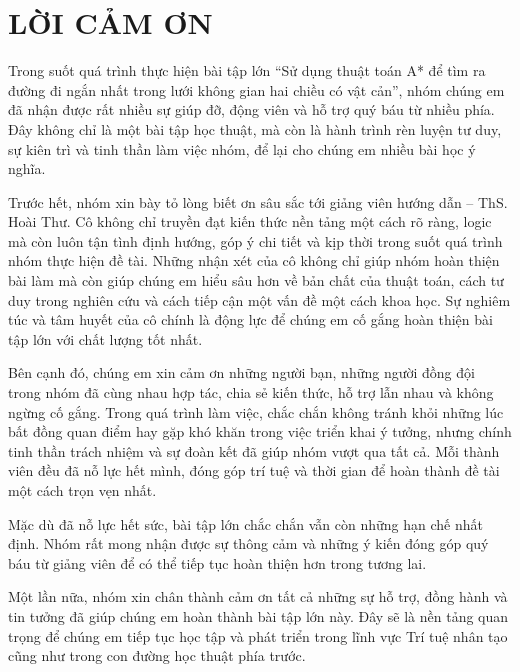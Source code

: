 \documentclass[../BTL.tex]{subfiles}
\begin{document}
\chapter*{LỜI CẢM ƠN}

Trong suốt quá trình thực hiện bài tập lớn “Sử dụng thuật toán A* để tìm ra đường đi ngắn nhất trong lưới không gian hai chiều có vật cản”, nhóm chúng em đã nhận được rất nhiều sự giúp đỡ, động viên và hỗ trợ quý báu từ nhiều phía. Đây không chỉ là một bài tập học thuật, mà còn là hành trình rèn luyện tư duy, sự kiên trì và tinh thần làm việc nhóm, để lại cho chúng em nhiều bài học ý nghĩa.

Trước hết, nhóm xin bày tỏ lòng biết ơn sâu sắc tới giảng viên hướng dẫn – ThS. Hoài Thư. Cô không chỉ truyền đạt kiến thức nền tảng một cách rõ ràng, logic mà còn luôn tận tình định hướng, góp ý chi tiết và kịp thời trong suốt quá trình nhóm thực hiện đề tài. Những nhận xét của cô không chỉ giúp nhóm hoàn thiện bài làm mà còn giúp chúng em hiểu sâu hơn về bản chất của thuật toán, cách tư duy trong nghiên cứu và cách tiếp cận một vấn đề một cách khoa học. Sự nghiêm túc và tâm huyết của cô chính là động lực để chúng em cố gắng hoàn thiện bài tập lớn với chất lượng tốt nhất.

Bên cạnh đó, chúng em xin cảm ơn những người bạn, những người đồng đội trong nhóm đã cùng nhau hợp tác, chia sẻ kiến thức, hỗ trợ lẫn nhau và không ngừng cố gắng. Trong quá trình làm việc, chắc chắn không tránh khỏi những lúc bất đồng quan điểm hay gặp khó khăn trong việc triển khai ý tưởng, nhưng chính tinh thần trách nhiệm và sự đoàn kết đã giúp nhóm vượt qua tất cả. Mỗi thành viên đều đã nỗ lực hết mình, đóng góp trí tuệ và thời gian để hoàn thành đề tài một cách trọn vẹn nhất.

Mặc dù đã nỗ lực hết sức, bài tập lớn chắc chắn vẫn còn những hạn chế nhất định. Nhóm rất mong nhận được sự thông cảm và những ý kiến đóng góp quý báu từ giảng viên để có thể tiếp tục hoàn thiện hơn trong tương lai.

Một lần nữa, nhóm xin chân thành cảm ơn tất cả những sự hỗ trợ, đồng hành và tin tưởng đã giúp chúng em hoàn thành bài tập lớn này. Đây sẽ là nền tảng quan trọng để chúng em tiếp tục học tập và phát triển trong lĩnh vực Trí tuệ nhân tạo cũng như trong con đường học thuật phía trước.
\end{document}
